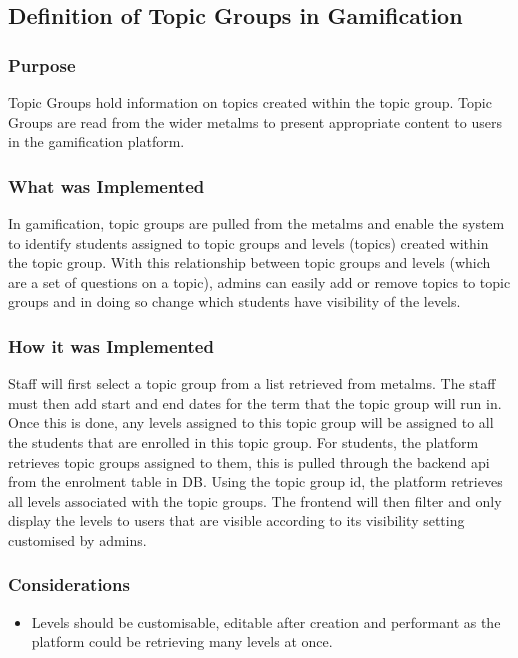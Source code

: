 \newpage

\subsection{Definition of Topic Groups in Gamification}

\subsubsection{Purpose}
Topic Groups hold information on topics created within the topic group. Topic Groups are read from the wider metalms to present appropriate content to users in the gamification platform.

\subsubsection{What was Implemented}
In gamification, topic groups are pulled from the metalms and enable the system to identify students assigned to topic groups and levels (topics) created within the topic group. With this relationship between topic groups and levels (which are a set of questions on a topic), admins can easily add or remove topics to topic groups and in doing so change which students have visibility of the levels.

\subsubsection{How it was Implemented}
Staff will first select a topic group from a list retrieved from metalms. The staff must then add start and end dates for the term that the topic group will run in. Once this is done, any levels assigned to this topic group will be assigned to all the students that are enrolled in this topic group. For students, the platform retrieves topic groups assigned to them, this is pulled through the backend api from the enrolment table in DB. Using the topic group id, the platform retrieves all levels associated with the topic groups. The frontend will then filter and only display the levels to users that are visible according to its visibility setting customised by admins.

\subsubsection{Considerations}
\begin{itemize}
    \item Levels should be customisable, editable after creation and performant as the platform could be retrieving many levels at once.
\end{itemize}


